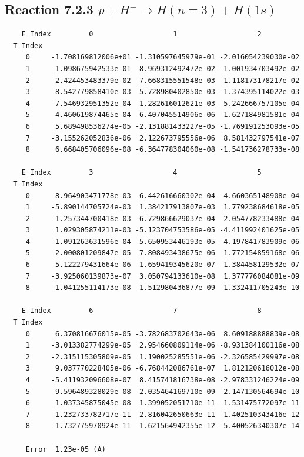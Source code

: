\documentclass[12pt,dvipdfmx]{article}
\begin{document}
\newpage
\subsection{
Reaction 7.2.3 $   p + H^- \rightarrow H(n=3) + H(1s)$}


\begin{small}\begin{verbatim}
    E Index         0                   1                   2
  T Index
     0     -1.708169812006e+01 -1.310597645979e-01 -2.016054239030e-02
     1     -1.098675942533e-01  8.969312492472e-02 -1.001934703492e-02
     2     -2.424453483379e-02 -7.668315551548e-03  1.118173178217e-02
     3      8.542779858410e-03 -5.728980402850e-03 -1.374395114022e-03
     4      7.546932951352e-04  1.282616012621e-03 -5.242666757105e-04
     5     -4.460619874465e-04 -6.407045514906e-06  1.627184981581e-04
     6      5.689498536274e-05 -2.131881433227e-05 -1.769191253093e-05
     7     -3.155262052836e-06  2.122673795556e-06  8.581432797541e-07
     8      6.668405706096e-08 -6.364778304060e-08 -1.541736278733e-08

    E Index         3                   4                   5
  T Index
     0      8.964903471778e-03  6.442616660302e-04 -4.660365148908e-04
     1     -5.890144705724e-03  1.384217913807e-03  1.779238684618e-05
     2     -1.257344700418e-03 -6.729866629037e-04  2.054778233488e-04
     3      1.029305874211e-03 -5.123704753586e-05 -4.411992401625e-05
     4     -1.091263631596e-04  5.650953446193e-05 -4.197841783909e-06
     5     -2.000801209847e-05 -7.808493438675e-06  1.772154859168e-06
     6      5.122279431664e-06  1.659419345620e-07 -1.384458129532e-07
     7     -3.925060139873e-07  3.050794133610e-08  1.377776084081e-09
     8      1.041255114173e-08 -1.512980436877e-09  1.332411705243e-10

    E Index         6                   7                   8
  T Index
     0      6.370816676015e-05 -3.782683702643e-06  8.609188888839e-08
     1     -3.013382774299e-05  2.954660809114e-06 -8.931384100116e-08
     2     -2.315115305809e-05  1.190025285551e-06 -2.326585429997e-08
     3      9.037770228405e-06 -6.768442086761e-07  1.812120616012e-08
     4     -5.411932096608e-07  8.415741816738e-08 -2.978331246224e-09
     5     -9.596489328029e-08 -2.035464169710e-09  2.147130564694e-10
     6      1.037345875045e-08  1.399052051710e-11 -1.531475772097e-11
     7     -1.232733782717e-11 -2.816042650663e-11  1.402510343416e-12
     8     -1.732775970924e-11  1.621564942355e-12 -5.400526340307e-14

     Error  1.23e-05 (A)
\end{verbatim}\end{small}
\end{document}
